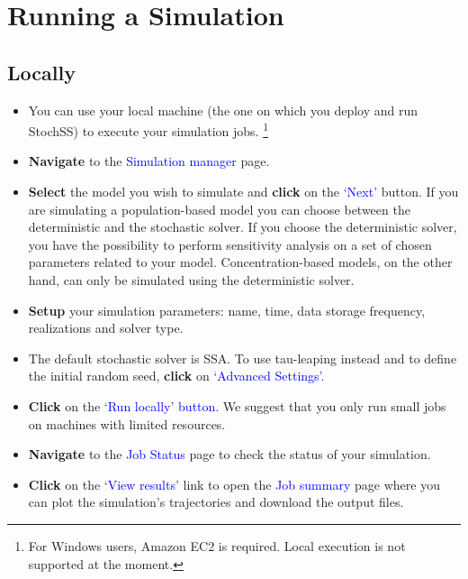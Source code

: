 \section{Running a Simulation}

\subsection{Locally}
\begin{itemize}
\item You can use your local machine (the one on which you deploy and run StochSS) to execute
your simulation jobs. \footnote{For Windows users, Amazon EC2 is required. Local execution is not supported at the moment.}
\item \textbf{Navigate} to the \textcolor{blue}{Simulation manager} page.
\item \textbf{Select} the model you wish to simulate and \textbf{click} on the \textcolor{blue}{`Next'} button. If you are simulating a population-based model you can choose between the deterministic and the stochastic solver. If you choose the deterministic solver, you have the possibility to perform sensitivity analysis on a set of chosen parameters related to your model. Concentration-based models, on the other hand, can only be simulated using the deterministic solver.
\item \textbf{Setup} your simulation parameters: name, time, data storage frequency, realizations and solver type. 
\item The default stochastic solver is SSA. To use tau-leaping instead and to define the initial random seed, \textbf{click} on \textcolor{blue}{`Advanced Settings'}.
\item \textbf{Click} on the \textcolor{blue}{`Run locally' button}. We suggest that you only run small jobs on machines with limited resources.
\item \textbf{Navigate} to the \textcolor{blue}{Job Status} page to check the status of your simulation.
\item \textbf{Click} on the \textcolor{blue}{`View results'} link to open the \textcolor{blue}{Job summary} page where you can plot the simulation's trajectories and download the  output files.
\end{itemize}

